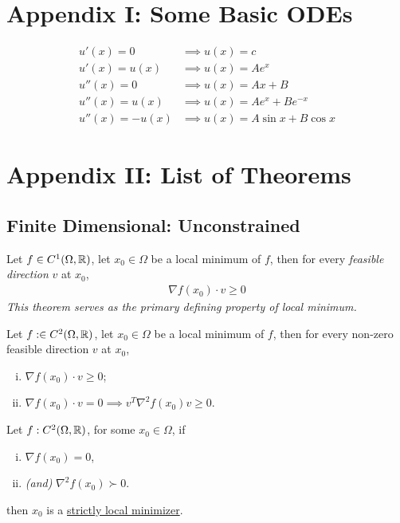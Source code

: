 \documentclass{article}
\begin{document}
\section{Appendix I: Some Basic ODEs}
	\begin{align}
		u'(x) = 0 &\implies u(x) = c \\
		u'(x) = u(x) &\implies u(x) = A e^x \\
		u''(x) = 0 &\implies u(x) = Ax + B \\
		u''(x) = u(x) &\implies u(x) = A e^x + B e^{-x} \\
		u''(x) = -u(x) &\implies u(x) = A \sin x + B \cos x
	\end{align}


\section{Appendix II: List of Theorems}
\subsection{Finite Dimensional: Unconstrained}
    \begin{theorem}
        Let $f \in C^1(\Omega, \mathbb{R})$, let $x_0 \in \Omega$ be a local minimum of $f$, then for every \emph{feasible direction} $v$ at $x_0$,
        \begin{align}
            \nabla f(x_0) \cdot v \geq 0
        \end{align}
        \emph{This theorem serves as the primary defining property of local minimum.}
    \end{theorem}

    \begin{theorem}
        Let $f: \in C^2(\Omega, \mathbb{R})$, let $x_0 \in \Omega$ be a local minimum of $f$, then for every non-zero feasible direction $v$ at $x_0$,
        \begin{enumerate}[(i)]
            \item $\nabla f(x_0) \cdot v \geq 0$;
            \item $\nabla f(x_0) \cdot v = 0 \implies v^T \nabla^2 f(x_0) v \geq 0$.
        \end{enumerate}
    \end{theorem}

    \begin{theorem}
        Let $f: C^2(\Omega, \mathbb{R})$, for some $x_0 \in \Omega$, if
        \begin{enumerate}[(i)]
            \item $\nabla f(x_0) = 0$,
            \item \emph{(and)} $\nabla^2 f(x_0) \succ 0$.
        \end{enumerate}
        then $x_0$ is a \ul{strictly local minimizer}.
    \end{theorem}
\end{document}
